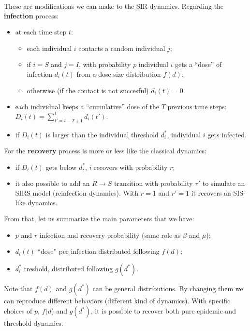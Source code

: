 \documentclass[../main/main.tex]{subfiles}
\begin{document}
These are modifications we can make to the SIR dynamics.
Regarding the \textbf{infection} process:

\begin{itemize}
\item at each time step \( t \):
        \begin{itemize}
        \item each individual $i$ contacts a random individual $j$;
        \item if $i = S$ and $j = I$, with probability $p$ individual $i$ gets a “dose” of infection $d_i(t)$ from a dose size distribution $f(d)$;
        \item otherwise (if the contact is not succesful) $d_i(t)=0$.
        \end{itemize}
\item each individual keeps a “cumulative” dose of the $T$ previous time steps: $D_i(t) = \sum_{t'=t-T+1}^{t} d_i(t')$.

\item if $D_i(t)$ is larger than the individual threshold $d_i^*$, individual $i$ gets infected.
\end{itemize}

For the \textbf{recovery} process is more or less like the classical dynamics:
\begin{itemize}
\item if $D_i(t)$ gets below $d_i^*$, $i$ recovers with probability $r$;

\item it also possible to add an $R \rightarrow S$ transition with probability $r'$ to simulate an SIRS model (reinfection dynamics). With $r = 1$ and $r' = 1$ it recovers an SIS-like dynamics.

\end{itemize}

From that, let us summarize the main parameters that we have:
\begin{itemize}
\item \( p \) and \( r \) infection and recovery probability (same role as \( \beta  \) and \( \mu  \));
\item $d_i(t)$ “dose” per infection distributed following $f(d)$;
\item \( d_i^* \) treshold, distributed following \( g(d^*) \).
\end{itemize}

Note that \( f(d) \) and \( g(d^*) \) can be general distributions. By changing them we can reproduce different behaviors (different kind of dynamics).
With specific choices of $p$, $f(d$) and $g(d^*)$, it is possible to recover both pure epidemic and threshold dynamics.
\end{document}
